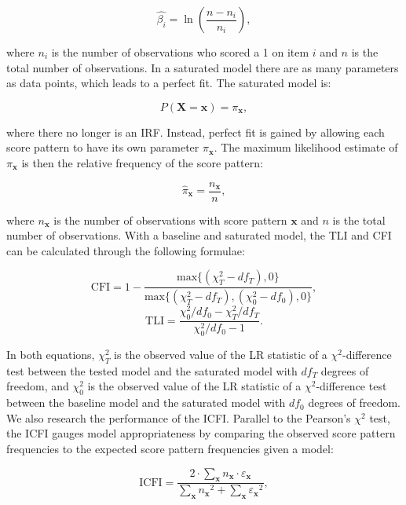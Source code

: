 \documentclass[Royal,sageapa,times,doublespace]{sagej}
\begin{document}
\begin{equation*}
\hat{\beta_{i}} = \ln(\frac{n - n_i}{n_i}), 
\end{equation*}

where $n_i$ is the number of observations who scored a 1 on item $i$ and $n$ is the total number of observations. In a saturated model there are as many parameters as data points, which leads to a perfect fit. The saturated model is:

\begin{equation}
P(\boldsymbol{X} = \boldsymbol{x}) = \pi_{\boldsymbol{x}},
\end{equation}

where there no longer is an IRF. Instead, perfect fit is gained by allowing each score pattern to have its own parameter $\pi_{\boldsymbol{x}}$. The maximum likelihood estimate of $\pi_{\boldsymbol{x}}$ is then the relative frequency of the score pattern:

\begin{equation*}
\hat{\pi}_{\boldsymbol{x}} = \frac{n_{\boldsymbol{x}}}{n},
\end{equation*}

where $n_{\boldsymbol{x}}$ is the number of observations with score pattern $\boldsymbol{x}$ and $n$ is the total number of observations. With a baseline and saturated model, the TLI and CFI can be calculated through the following formulae:

\begin{equation}
\text{CFI} = 1 - \frac{\text{max}\{(\chi^2_T - df_T), 0\}}{\text{max}\{(\chi^2_T - df_T), (\chi^2_0 - df_0), 0\}},
\end{equation}
\begin{equation}
\text{TLI} = \frac{\chi^2_0/df_0 - \chi^2_T/df_T}{\chi^2_0/df_0 - 1}.
\end{equation}

In both equations, $\chi^{2}_{T}$ is the observed value of the LR statistic of a $\chi^2$-difference test between the tested model and the saturated model with $df_T$ degrees of freedom, and $\chi^{2}_{0}$ is the observed value of the LR statistic of a $\chi^2$-difference test between the baseline model and the saturated model with $df_0$ degrees of freedom. We also research the performance of the ICFI. Parallel to the Pearson's $\chi^2$ test, the ICFI gauges model appropriateness by comparing the observed score pattern frequencies to the expected score pattern frequencies given a model:

\begin{equation}
\text{ICFI} = \frac{2 \cdot \sum_{\boldsymbol{x}}  n_{\boldsymbol{x}} \cdot \varepsilon_{\boldsymbol{x}}  }{  \sum_{\boldsymbol{x}}  {n_{\boldsymbol{x}}}^2 +  \sum_{\boldsymbol{x}}  {\varepsilon_{\boldsymbol{x}}} ^2 },
\end{equation}
\end{document}
